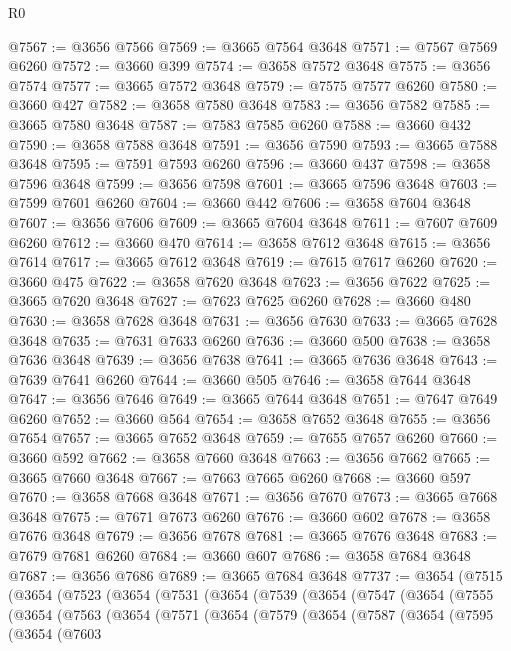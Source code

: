 \begin{lexlean}{R0}
\begin{coremodule}
@7567 := @3656 @7566
@7569 := @3665 @7564 @3648
@7571 := @7567 @7569 @6260
@7572 := @3660 @399
@7574 := @3658 @7572 @3648
@7575 := @3656 @7574
@7577 := @3665 @7572 @3648
@7579 := @7575 @7577 @6260
@7580 := @3660 @427
@7582 := @3658 @7580 @3648
@7583 := @3656 @7582
@7585 := @3665 @7580 @3648
@7587 := @7583 @7585 @6260
@7588 := @3660 @432
@7590 := @3658 @7588 @3648
@7591 := @3656 @7590
@7593 := @3665 @7588 @3648
@7595 := @7591 @7593 @6260
@7596 := @3660 @437
@7598 := @3658 @7596 @3648
@7599 := @3656 @7598
@7601 := @3665 @7596 @3648
@7603 := @7599 @7601 @6260
@7604 := @3660 @442
@7606 := @3658 @7604 @3648
@7607 := @3656 @7606
@7609 := @3665 @7604 @3648
@7611 := @7607 @7609 @6260
@7612 := @3660 @470
@7614 := @3658 @7612 @3648
@7615 := @3656 @7614
@7617 := @3665 @7612 @3648
@7619 := @7615 @7617 @6260
@7620 := @3660 @475
@7622 := @3658 @7620 @3648
@7623 := @3656 @7622
@7625 := @3665 @7620 @3648
@7627 := @7623 @7625 @6260
@7628 := @3660 @480
@7630 := @3658 @7628 @3648
@7631 := @3656 @7630
@7633 := @3665 @7628 @3648
@7635 := @7631 @7633 @6260
@7636 := @3660 @500
@7638 := @3658 @7636 @3648
@7639 := @3656 @7638
@7641 := @3665 @7636 @3648
@7643 := @7639 @7641 @6260
@7644 := @3660 @505
@7646 := @3658 @7644 @3648
@7647 := @3656 @7646
@7649 := @3665 @7644 @3648
@7651 := @7647 @7649 @6260
@7652 := @3660 @564
@7654 := @3658 @7652 @3648
@7655 := @3656 @7654
@7657 := @3665 @7652 @3648
@7659 := @7655 @7657 @6260
@7660 := @3660 @592
@7662 := @3658 @7660 @3648
@7663 := @3656 @7662
@7665 := @3665 @7660 @3648
@7667 := @7663 @7665 @6260
@7668 := @3660 @597
@7670 := @3658 @7668 @3648
@7671 := @3656 @7670
@7673 := @3665 @7668 @3648
@7675 := @7671 @7673 @6260
@7676 := @3660 @602
@7678 := @3658 @7676 @3648
@7679 := @3656 @7678
@7681 := @3665 @7676 @3648
@7683 := @7679 @7681 @6260
@7684 := @3660 @607
@7686 := @3658 @7684 @3648
@7687 := @3656 @7686
@7689 := @3665 @7684 @3648
@7737 := @3654
    (@7515
      (@3654
        (@7523
          (@3654
            (@7531
              (@3654
                (@7539
                  (@3654
                    (@7547
                      (@3654
                        (@7555
                          (@3654
                            (@7563
                              (@3654
                                (@7571
                                  (@3654
                                    (@7579
                                      (@3654
                                        (@7587
                                          (@3654
                                            (@7595
                                              (@3654
                                                (@7603

\end{coremodule}
\end{lexlean}
